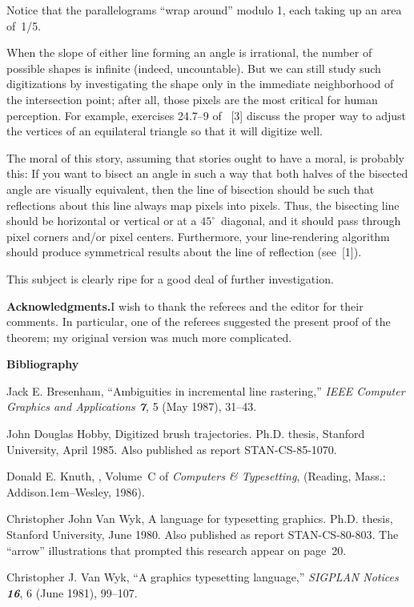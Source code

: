 \noindent
Notice that the parallelograms ``wrap around'' modulo 1, each taking
up an area of~1/5.

When the slope of either line forming an angle is irrational, the
number of possible shapes is infinite (indeed, uncountable). But we can
still study such digitizations by investigating the shape only in the
immediate neighborhood of the intersection point; after all, those
pixels are the most critical for human perception. For example,
exercises 24.7--9 of 
\MFbook~[3]
discuss the proper way to adjust the vertices of an equilateral
triangle so that it will digitize well.

The moral of this story, assuming that stories ought to have a moral,
is probably this: If you want to bisect an angle in such a way that
both halves of the bisected angle are visually equivalent, then the
line of bisection should be such that reflections about this line
always map
pixels into pixels. Thus, the bisecting line should be horizontal or
vertical or at a $45^{\circ}$~diagonal, and it should pass through
pixel corners and/or pixel centers. Furthermore, your line-rendering
algorithm should produce symmetrical results about the line of
reflection (see~[1]).

This subject is clearly ripe for a good deal of further investigation.

\bigskip\noindent
{\bf Acknowledgments.}\enspace I wish to thank the referees and the
editor for their comments. In particular, one of the referees
suggested the present proof of the theorem; my original version was
much more complicated.

\bigskip
\centerline{\bf Bibliography}
\medskip

\bib
[1]\enspace
Jack E. Bresenham, ``Ambiguities in incremental line rastering,''
{\sl IEEE Computer Graphics and Applications\/ \bf 7}, 5 (May 1987),
31--43.

\bib
[2]\enspace
John Douglas Hobby, Digitized brush trajectories. Ph.D. thesis,
Stanford University, April 1985. Also published as report
STAN-CS-85-1070. 

\bib
[3]\enspace
Donald E. Knuth, \MFbook, Volume~C of {\sl Computers \&
Typesetting}, (Reading, Mass.: Addison\kern.1em--Wesley, 1986).

\bib
[4]\enspace 
Christopher John Van Wyk, A language for typesetting graphics.
Ph.D. thesis, Stanford University, June 1980. Also published as report
STAN-CS-80-803. The ``arrow'' illustrations that prompted this
research appear on page~20.

\bib
[5]\enspace
Christopher J. Van Wyk, ``A graphics typesetting language,'' {\sl
SIGPLAN Notices\/ \bf 16}, 6 (June 1981), 99--107.


\bye

